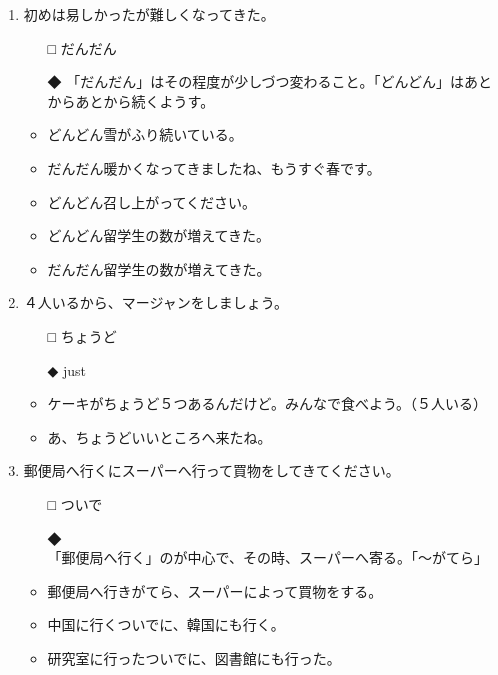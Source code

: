 \documentclass[
uplatex,
b5paper,
10pt,
dvipdfmx
]{jsbook}
\begin{document}
\begin{enumerate}
\item 初めは易しかったが\underline{\hspace{3zw}}難しくなってきた。
\begin{itemize}
\item[□] だんだん
\item[◆] 「だんだん」はその程度が少しづつ変わること。「どんどん」はあと
	  からあとから続くようす。
\end{itemize}
\begin{itemize}
\item どんどん雪がふり続いている。
\item だんだん暖かくなってきましたね、もうすぐ春です。
\item どんどん召し上がってください。
\item どんどん留学生の数が増えてきた。
\item だんだん留学生の数が増えてきた。     
\end{itemize}

\item \underline{\hspace{3zw}}４人いるから、マージャンをしましょう。
\begin{itemize}
\item[□] ちょうど
\item[◆] just
\end{itemize}
\begin{itemize}
 \item ケーキがちょうど５つあるんだけど。みんなで食べよう。（５人いる）
 \item あ、ちょうどいいところへ来たね。  
\end{itemize}

\item 郵便局へ行く\underline{\hspace{3zw}}にスーパーへ行って買物をしてきてください。
\begin{itemize}
\item[□] ついで
\item[◆] 「郵便局へ行く」のが中心で、その時、スーパーへ寄る。「〜がてら」
\end{itemize}
\begin{itemize}
\item 郵便局へ行きがてら、スーパーによって買物をする。
\item 中国に行くついでに、韓国にも行く。
\item 研究室に行ったついでに、図書館にも行った。
\end{itemize}


\end{enumerate}
\end{document}
